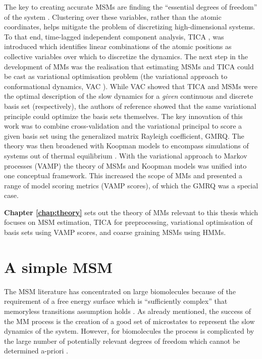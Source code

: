 The key to creating accurate MSMs are finding the ``essential degrees of freedom'' of the system \cite{zwanzigClassicalDynamicsContinuous1983a, schutteDirectApproachConformational1999}. Clustering over these variables, rather than the atomic coordinates, helps mitigate the problem of discretizing high-dimensional systems. To that end, time-lagged independent component analysis, TICA \cite{perez-hernandezIdentificationSlowMolecular2013a, schwantesImprovementsMarkovState2013}, was introduced which identifies linear combinations of the atomic positions as collective variables over which to discretize the dynamics. 
The next step in the development of MMs was the realisation that estimating MSMs and TICA could be cast as variational optimisation problem (the variational approach to conformational dynamics, VAC \cite{nuskeVariationalApproachMolecular2014}). While VAC showed that TICA and MSMs were the optimal description of the slow dynamics for a \emph{given} continuous and discrete basis set (respectively), the authors of reference \cite{mcgibbonVariationalCrossvalidationSlow2015} showed that the same variational principle could optimize the basis sets themselves. The key innovation of this work was to combine cross-validation \cite{arlotSurveyCrossvalidationProcedures2009} and the variational principal to score a given basis set using the generalized matrix Rayleigh coefficient, GMRQ. The theory was then broadened with Koopman models to encompass simulations of systems out of thermal equilibrium \cite{wuVariationalKoopmanModels2017}. With the variational approach to Markov processes (VAMP) the theory of MSMs and Koopman models was unified into one conceptual framework. This increased the scope of MMs and presented a range of model scoring metrics (VAMP scores), of which the GMRQ was a special case.

\textbf{Chapter \ref{chap:theory}} sets out the theory of MMs relevant to this thesis which focuses on MSM estimation, TICA for preprocessing, variational optimisation of basis sets using VAMP scores, and coarse graining MSMs using HMMs. 

\section{A simple MSM}
The MSM literature has concentrated on large biomolecules because of the requirement of a free energy surface which is ``sufficiently complex'' that memoryless transitions assumption holds \cite{zwanzigClassicalDynamicsContinuous1983a}. As already mentioned, the success of the MM process is the creation of a good set of microstates to represent the slow dynamics of the system. However, for biomolecules the process is complicated by the large number of potentially relevant degrees of freedom which cannot be determined a-priori \cite{shallowayMacrostatesClassicalStochastic1996}. 

